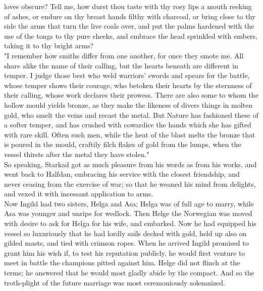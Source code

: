 \documentclass[10pt,a4paper]{report}
\begin{document}
loves obscure? Tell me, how durst thou taste with thy rosy lips a mouth reeking of ashes, or endure on thy breast hands filthy with charcoal, or bring close to thy side the arms that turn the live coals over, and put the palms hardened with the use of the tongs to thy pure cheeks, and embrace the head sprinkled with embers, taking it to thy bright arms?\\

"I remember how smiths differ from one another, for once they smote me. All share alike the name of their calling, but the hearts beneath are different in temper. I judge those best who weld warriors' swords and spears for the battle, whose temper shows their courage, who betoken their hearts by the sternness of their calling, whose work declares their prowess. There are also some to whom the hollow mould yields bronze, as they make the likeness of divers things in molten gold, who smelt the veins and recast the metal. But Nature has fashioned these of a softer temper, and has crushed with cowardice the hands which she has gifted with rare skill. Often such men, while the heat of the blast melts the bronze that is poured in the mould, craftily filch flakes of gold from the lumps, when the vessel thirsts after the metal they have stolen."\\

So speaking, Starkad got as much pleasure from his words as from his works, and went back to Halfdan, embracing his service with the closest friendship, and never ceasing from the exercise of war; so that he weaned his mind from delights, and vexed it with incessant application to arms.\\

Now Ingild had two sisters, Helga and Asa; Helga was of full age to marry, while Asa was younger and unripe for wedlock. Then Helge the Norwegian was moved with desire to ask for Helga for his wife, and embarked. Now he had equipped his vessel so luxuriously that he had lordly sails decked with gold, held up also on gilded masts, and tied with crimson ropes. When he arrived Ingild promised to grant him his wish if, to test his reputation publicly, he would first venture to meet in battle the champions pitted against him. Helge did not flinch at the terms; he answered that he would most gladly abide by the compact. And so the troth-plight of the future marriage was most ceremoniously solemnized.\\
\end{document}
